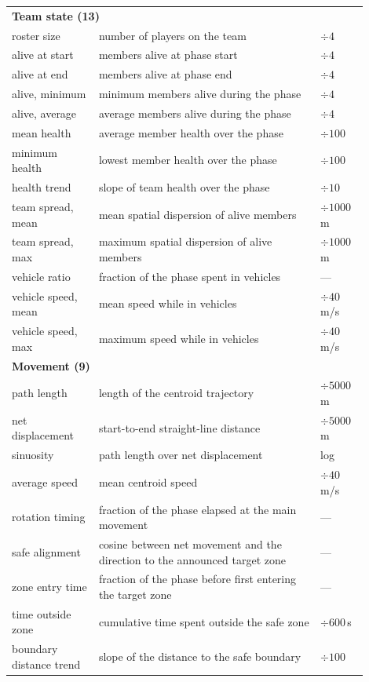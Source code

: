 \begin{table}[t]
\begin{tabular}{p{0.22\linewidth}p{0.56\linewidth}p{0.12\linewidth}}
\multicolumn{3}{l}{\textbf{Team state (13)}} \\
roster size & number of players on the team & \(\div 4\) \\
alive at start & members alive at phase start & \(\div 4\) \\
alive at end & members alive at phase end & \(\div 4\) \\
alive, minimum & minimum members alive during the phase & \(\div 4\) \\
alive, average & average members alive during the phase & \(\div 4\) \\
mean health & average member health over the phase & \(\div 100\) \\
minimum health & lowest member health over the phase & \(\div 100\) \\
health trend & slope of team health over the phase & \(\div 10\) \\
team spread, mean & mean spatial dispersion of alive members & \(\div 1000\)\,m \\
team spread, max & maximum spatial dispersion of alive members & \(\div 1000\)\,m \\
vehicle ratio & fraction of the phase spent in vehicles & --- \\
vehicle speed, mean & mean speed while in vehicles & \(\div 40\)\,m/s \\
vehicle speed, max & maximum speed while in vehicles & \(\div 40\)\,m/s \\
\midrule
\multicolumn{3}{l}{\textbf{Movement (9)}} \\
path length & length of the centroid trajectory & \(\div 5000\)\,m \\
net displacement & start-to-end straight-line distance & \(\div 5000\)\,m \\
sinuosity & path length over net displacement & log \\
average speed & mean centroid speed & \(\div 40\)\,m/s \\
rotation timing & fraction of the phase elapsed at the main movement & --- \\
safe alignment & cosine between net movement and the direction to the announced target zone & --- \\
zone entry time & fraction of the phase before first entering the target zone & --- \\
time outside zone & cumulative time spent outside the safe zone & \(\div 600\)\,s \\
boundary distance trend & slope of the distance to the safe boundary & \(\div 100\) \\
\bottomrule
\end{tabular}
\end{table}


